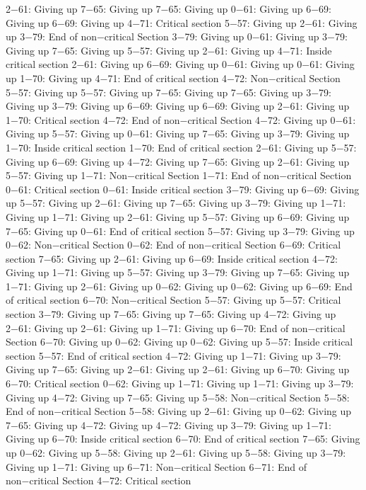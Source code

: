 2−61: Giving up
7−65: Giving up
7−65: Giving up
0−61: Giving up
6−69: Giving up
6−69: Giving up
4−71: Critical section
5−57: Giving up
2−61: Giving up
3−79: End of non−critical Section
3−79: Giving up
0−61: Giving up
3−79: Giving up
7−65: Giving up
5−57: Giving up
2−61: Giving up
4−71: Inside critical section
2−61: Giving up
6−69: Giving up
0−61: Giving up
0−61: Giving up
1−70: Giving up
4−71: End of critical section
4−72: Non−critical Section
5−57: Giving up
5−57: Giving up
7−65: Giving up
7−65: Giving up
3−79: Giving up
3−79: Giving up
6−69: Giving up
6−69: Giving up
2−61: Giving up
1−70: Critical section
4−72: End of non−critical Section
4−72: Giving up
0−61: Giving up
5−57: Giving up
0−61: Giving up
7−65: Giving up
3−79: Giving up
1−70: Inside critical section
1−70: End of critical section
2−61: Giving up
5−57: Giving up
6−69: Giving up
4−72: Giving up
7−65: Giving up
2−61: Giving up
5−57: Giving up
1−71: Non−critical Section
1−71: End of non−critical Section
0−61: Critical section
0−61: Inside critical section
3−79: Giving up
6−69: Giving up
5−57: Giving up
2−61: Giving up
7−65: Giving up
3−79: Giving up
1−71: Giving up
1−71: Giving up
2−61: Giving up
5−57: Giving up
6−69: Giving up
7−65: Giving up
0−61: End of critical section
5−57: Giving up
3−79: Giving up
0−62: Non−critical Section
0−62: End of non−critical Section
6−69: Critical section
7−65: Giving up
2−61: Giving up
6−69: Inside critical section
4−72: Giving up
1−71: Giving up
5−57: Giving up
3−79: Giving up
7−65: Giving up
1−71: Giving up
2−61: Giving up
0−62: Giving up
0−62: Giving up
6−69: End of critical section
6−70: Non−critical Section
5−57: Giving up
5−57: Critical section
3−79: Giving up
7−65: Giving up
7−65: Giving up
4−72: Giving up
2−61: Giving up
2−61: Giving up
1−71: Giving up
6−70: End of non−critical Section
6−70: Giving up
0−62: Giving up
0−62: Giving up
5−57: Inside critical section
5−57: End of critical section
4−72: Giving up
1−71: Giving up
3−79: Giving up
7−65: Giving up
2−61: Giving up
2−61: Giving up
6−70: Giving up
6−70: Critical section
0−62: Giving up
1−71: Giving up
1−71: Giving up
3−79: Giving up
4−72: Giving up
7−65: Giving up
5−58: Non−critical Section
5−58: End of non−critical Section
5−58: Giving up
2−61: Giving up
0−62: Giving up
7−65: Giving up
4−72: Giving up
4−72: Giving up
3−79: Giving up
1−71: Giving up
6−70: Inside critical section
6−70: End of critical section
7−65: Giving up
0−62: Giving up
5−58: Giving up
2−61: Giving up
5−58: Giving up
3−79: Giving up
1−71: Giving up
6−71: Non−critical Section
6−71: End of non−critical Section
4−72: Critical section
